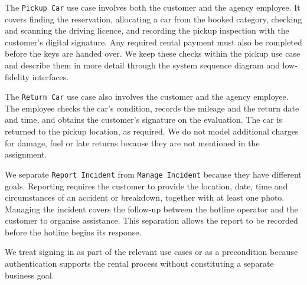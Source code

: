 \documentclass[12pt,a4paper]{report}
\begin{document}
The \texttt{Pickup Car} use case involves both the customer and the agency employee. It covers finding the reservation, allocating a car from the booked category, checking and scanning the driving licence,
and recording the pickup inspection with the customer's digital signature. Any required rental payment must also be completed before the keys are handed over.
We keep these checks within the pickup use case and describe them in more detail through the system sequence diagram and low-fidelity interfaces.

The \texttt{Return Car} use case also involves the customer and the agency employee. The employee checks the car's condition, records the mileage and the return date and time, and obtains the customer's signature on the evaluation.
The car is returned to the pickup location, as required.
We do not model additional charges for damage, fuel or late returns because they are not mentioned in the assignment.

We separate \texttt{Report Incident} from \texttt{Manage Incident} because they have different goals.
Reporting requires the customer to provide the location, date, time and circumstances of an accident or breakdown, together with at least one photo.
Managing the incident covers the follow-up between the hotline operator and the customer to organise assistance.
This separation allows the report to be recorded before the hotline begins its response.

We treat signing in as part of the relevant use cases or as a precondition because authentication supports the rental process without constituting a separate business goal.
\end{document}

